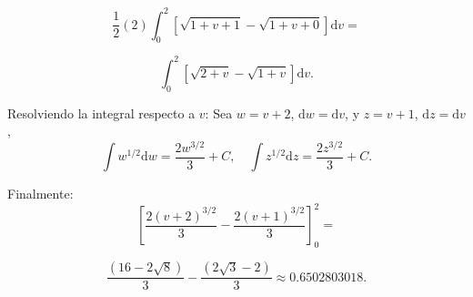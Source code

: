 \begin{ejercicio}[title=Ejercicio 8]
\[
\frac{1}{2} (2) \int_0^2 \left[ \sqrt{1+v+1} - \sqrt{1+v+0} \right] \mathrm{d}v =
\]

\[
\int_0^2 \left[ \sqrt{2+v} - \sqrt{1+v} \right] \mathrm{d}v.
\]

Resolviendo la integral respecto a \(v\):
Sea \(w = v+2\), \(\mathrm{d}w = \mathrm{d}v\), y \(z = v+1\), \(\mathrm{d}z = \mathrm{d}v\),
\[
\int w^{1/2} \mathrm{d}w = \frac{2w^{3/2}}{3} + C, \quad 
\int z^{1/2} \mathrm{d}z = \frac{2z^{3/2}}{3} + C.
\]

Finalmente:
\[
\left[ \frac{2(v+2)^{3/2}}{3} - \frac{2(v+1)^{3/2}}{3} \right]_0^2 =
\]

\[
\frac{(16 - 2\sqrt{8})}{3} - \frac{(2\sqrt{3} - 2)}{3} \approx 0.6502803018.
\]
\end{ejercicio}

